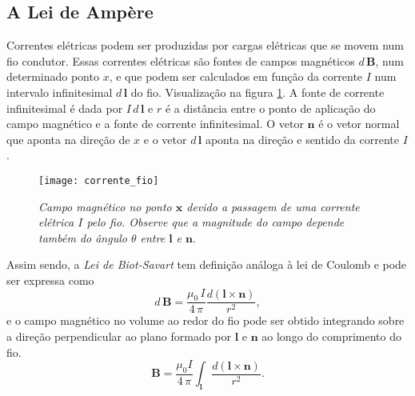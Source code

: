 \subsection{A Lei de Ampère}
Correntes elétricas podem ser produzidas por cargas elétricas que se movem num fio condutor. Essas correntes elétricas são fontes de campos magnéticos $d\,\textbf{B}$, num determinado ponto $x$, e que podem ser calculados em função da corrente $I$ num intervalo infinitesimal $d\,\textbf{l}$ do fio. Visualização na figura \ref{fig.corrente_fio}. A fonte de corrente infinitesimal é dada por $I\,d\,\textbf{l}$ e $r$ é a distância entre o ponto de aplicação do campo magnético e a fonte de corrente infinitesimal. O vetor $\textbf{n}$ é o vetor normal que aponta na direção de $x$ e o vetor $d\,\textbf{l}$ aponta na direção e sentido da corrente $I$. 
\begin{figure}
\centering
\texttt{[image: corrente\_fio]}
\caption{\textit{Campo magnético no ponto $\textbf{x}$ devido a passagem de uma corrente elétrica $I$ pelo fio. Observe que a magnitude do campo depende também do ângulo $\theta$ entre $\textbf{l}$ e $\textbf{n}$}.}
\label{fig.corrente_fio}
\end{figure}
Assim sendo, a \textit{Lei de Biot-Savart} tem definição análoga à lei de Coulomb e pode ser expressa como
\begin{equation}\label{eq.lei_biot_savart}
d\,\textbf{B}=\frac{\mu_0\,I}{4\,\pi}\frac{d(\textbf{l}\times\textbf{n})}{r^2},
\end{equation}
e o campo magnético no volume ao redor do fio pode ser obtido integrando sobre a direção perpendicular ao plano formado por $\textbf{l}$ e $\textbf{n}$ ao longo do comprimento do fio.
\begin{equation}
\textbf{B}=\frac{\mu_0I}{4\,\pi}\int_{\textbf{l}}\frac{d(\textbf{l}\times\textbf{n})}{r^2}.
\end{equation}

